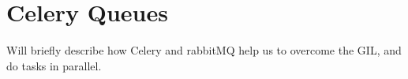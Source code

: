\section{Celery Queues}

Will briefly describe how Celery and rabbitMQ help us to overcome the GIL, and do tasks in parallel.